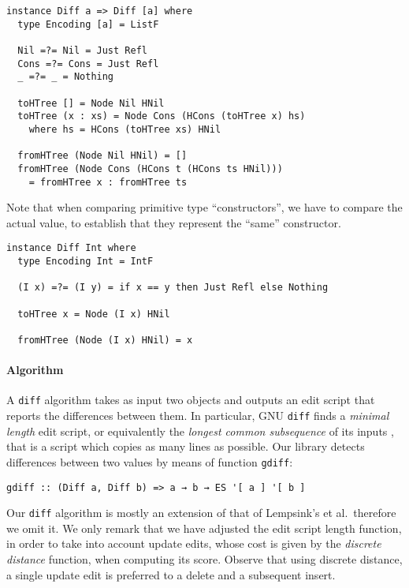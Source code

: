 \documentclass{sigplanconf}
\theoremstyle{plain}
\begin{document}
\begin{verbatim}
instance Diff a => Diff [a] where	
  type Encoding [a] = ListF

  Nil =?= Nil = Just Refl
  Cons =?= Cons = Just Refl
  _ =?= _ = Nothing

  toHTree [] = Node Nil HNil
  toHTree (x : xs) = Node Cons (HCons (toHTree x) hs)
    where hs = HCons (toHTree xs) HNil

  fromHTree (Node Nil HNil) = []
  fromHTree (Node Cons (HCons t (HCons ts HNil))) 
    = fromHTree x : fromHTree ts
\end{verbatim} 
%
Note that when comparing primitive type ``constructors'',
we have to compare the actual value, to establish 
that they represent the ``same'' constructor.
\begin{verbatim}
instance Diff Int where
  type Encoding Int = IntF

  (I x) =?= (I y) = if x == y then Just Refl else Nothing
  
  toHTree x = Node (I x) HNil
  
  fromHTree (Node (I x) HNil) = x
\end{verbatim}
%
%

\paragraph{Algorithm}
A  \texttt{diff} algorithm takes as input two objects and outputs an
edit script that reports the differences between them.
%
In particular, GNU \texttt{diff} finds a \emph{minimal length} edit
script, or equivalently the \emph{longest common subsequence} of its
inputs \cite{Berg00, PierceDiff3}, that is a script which 
copies as many lines as possible.
%
Our library detects differences between two values by means of function \texttt{gdiff}:
\begin{verbatim}
gdiff :: (Diff a, Diff b) => a → b → ES '[ a ] '[ b ]
\end{verbatim}
%
Our \texttt{diff} algorithm is mostly an extension of that of
Lempsink's et al.\ therefore we omit it.
%
We only remark that we have adjusted the edit script length function,
in order to take into account update edits, whose cost is given by the
\emph{discrete distance} function, when computing its score.
%
%
Observe that using discrete distance, a single update edit is
preferred to a delete and a subsequent insert.
%
\end{document}
